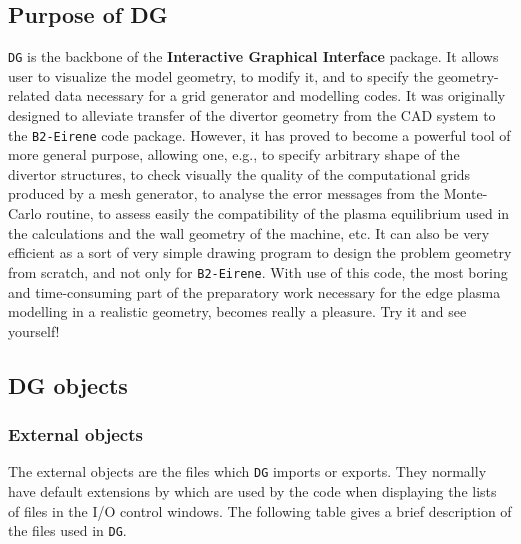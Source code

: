\documentclass[a4paper,10pt]{report}
\begin{document}
\subsection{Purpose of DG}

{\tt DG} is the backbone of the {\bf Interactive Graphical Interface}
package. It allows user to visualize the model geometry, to modify it,
and to specify the geometry-related data necessary for a grid
generator and modelling codes. It was originally designed to alleviate
transfer of the divertor geometry from the CAD system to the
{\tt B2-Eirene} code package. However, it has proved to become a powerful
tool of more general purpose, allowing one, e.g., to specify
arbitrary shape of the divertor structures, to check visually the
quality of the computational grids produced by a mesh generator, to
analyse the error messages from the Monte-Carlo routine, to assess
easily the compatibility of the plasma equilibrium used in the
calculations and the wall geometry of the machine, etc. It can also
be very efficient as a sort of very simple drawing program to design
the problem geometry from scratch, and not only for {\tt B2-Eirene}. With
use of this code, the most boring and time-consuming part of the
preparatory work necessary for the edge plasma modelling in a
realistic geometry, becomes really a pleasure. Try it and see
yourself!

\subsection{DG objects}

\subsubsection{External objects}

The external objects are the files which {\tt DG} imports or exports. They
normally have default extensions by which are used by the code when
displaying the lists of files in the I/O control windows. The
following table gives a brief description of the files used in {\tt DG}.
\end{document}
